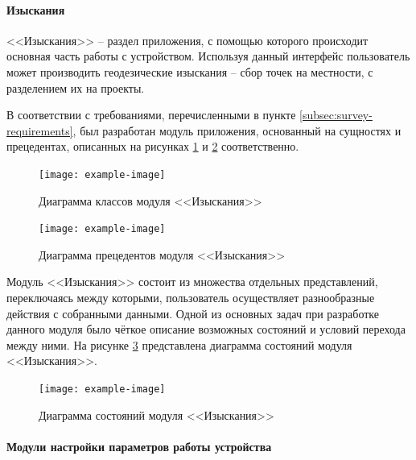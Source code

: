 \paragraph{Изыскания}

<<Изыскания>> -- раздел приложения, с помощью которого происходит основная часть работы с устройством. Используя данный интерфейс пользователь может производить геодезические изыскания -- сбор точек на местности, с разделением их на проекты.

В соответствии с требованиями, перечисленными в пункте \ref{subsec:survey-requirements}, был разработан модуль приложения, основанный на сущностях и прецедентах, описанных на рисунках \ref{fig:survey-uml-classes} и \ref{fig:survey-uml-usecase} соответственно.

\begin{figure}[h!]
  \centering
  \setlength{\fboxsep}{5pt}
  \texttt{[image: example-image]}
  \vspace*{6pt}
  \caption{Диаграмма классов модуля <<Изыскания>>}
  \label{fig:survey-uml-classes}
\end{figure}

\begin{figure}[h!]
  \centering
  \setlength{\fboxsep}{5pt}
  \texttt{[image: example-image]}
  \vspace*{6pt}
  \caption{Диаграмма прецедентов модуля <<Изыскания>>}
  \label{fig:survey-uml-usecase}
\end{figure}

Модуль <<Изыскания>> состоит из множества отдельных представлений, переключаясь между которыми, пользователь осуществляет разнообразные действия с собранными данными. Одной из основных задач при разработке данного модуля было чёткое описание возможных состояний и условий перехода между ними. На рисунке \ref{fig:survey-uml-state} представлена диаграмма состояний модуля <<Изыскания>>.

\begin{figure}[h!]
  \centering
  \setlength{\fboxsep}{5pt}
  \texttt{[image: example-image]}
  \vspace*{6pt}
  \caption{Диаграмма состояний модуля <<Изыскания>>}
  \label{fig:survey-uml-state}
\end{figure}

\paragraph{Модули настройки параметров работы устройства}

